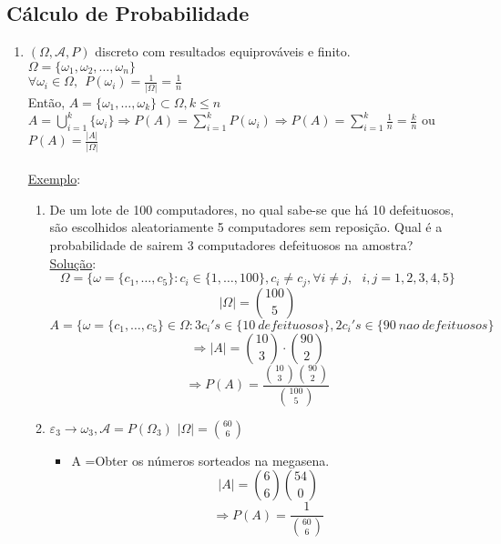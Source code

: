 \documentclass[a4paper,12pt]{article}
\begin{document}
\newpage
\subsection{Cálculo de Probabilidade}

\begin{enumerate}[label = \alph*)]
	\item $(\Omega,\mathscr{A},P)$ discreto com resultados equiprováveis e finito.\\
	$\Omega = \{\omega_1,\omega_2,\ldots,\omega_n\}$\\
	$\forall \omega_i \in \Omega, \ \ P(\omega_i)=\frac{1}{|\Omega|}=\frac{1}{n}$\\
	Então, $A=\{\omega_1,\ldots, \omega_k  \} \subset \Omega, k\le n$\\
	$A=\bigcup\limits_{i=1}^k\{\omega_i\}\Rightarrow P(A) = \sum\limits_{i=1}^{k} P(\omega_i) \Rightarrow P(A) = \sum\limits_{i=1}^{k} \frac{1}{n}=\frac{k}{n}$ ou $P(A)=\frac{|A|}{|\Omega|} $\\
	\\
	\underline{Exemplo}:\\
	
	\begin{enumerate}[label=\textbf{\arabic*)}]
		\item 
	
	De um lote de 100 computadores, no qual sabe-se que há 10 defeituosos, são escolhidos aleatoriamente  5 computadores sem reposição.
	Qual é a probabilidade de sairem 3 computadores defeituosos na amostra?\\
	
	\underline{Solução}:
	$$\Omega = \bigg\{\omega= \{c_1,\ldots,c_5 \}: c_i \in \{1,\ldots,100\}, c_i\ne c_j , \forall i\ne j,\ \ \ i,j=1,2,3,4,5  \bigg\} $$
	$$ |\Omega| =\binom{100}{5}   $$
	$$A = \bigg\{\omega= \{c_1,\ldots,c_5 \} \in \Omega: 3 c_i's \in \{10\ defeituosos \}, 2 c_i's \in \{90 \ nao \ defeituosos\}$$
	$$\Rightarrow |A| = \binom{10}{3}\cdot\binom{90}{2} $$
	$$\Rightarrow P(A) = \frac{\binom{10}{3}\binom{90}{2}}{\binom{100}{5}} $$
	
	\item $\varepsilon_3 \rightarrow \omega_3, \mathscr{A}=P(\Omega_3)$    $ |\Omega| = \binom{60}{6}$
	\begin{itemize}
		\item 
	
	A =Obter os números sorteados na megasena.
	$$ |A| = \binom{6}{6}\binom{54}{0} $$
	$$\Rightarrow P(A) = \frac{1}{\binom{60}{6}} $$
	

\end{itemize}
\end{enumerate}
\end{enumerate}
\end{document}
